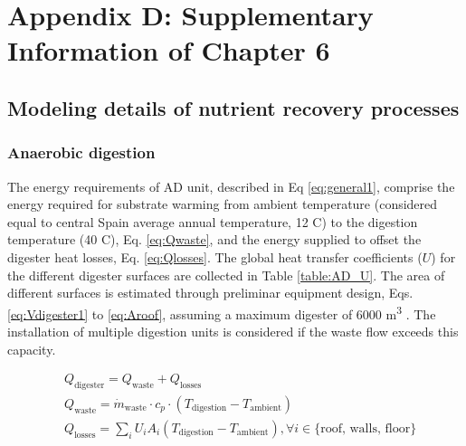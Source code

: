 \chapter{Appendix D: Supplementary Information of Chapter 6}
\begin{refsection}[referencesApD]
	
\section{Modeling details of nutrient recovery processes}
\subsection{Anaerobic digestion}
The energy requirements of AD unit, described in Eq  \ref{eq:general1}, comprise the energy required for substrate warming from ambient temperature (considered equal to central Spain average annual temperature, 12 \textdegree C) to the digestion temperature (40 \textdegree C), Eq. \ref{eq:Qwaste}, and the energy supplied to offset the digester heat losses, Eq. \ref{eq:Qlosses}. The global heat transfer coefficients ($U$) for the different digester surfaces are collected in Table \ref{table:AD_U}. 
The area of different surfaces is estimated through preliminar equipment design, Eqs. \ref{eq:Vdigester1} to \ref{eq:Aroof}, assuming a maximum digester of 6000 m\textsuperscript{3} \citep{6000AD}. The installation of multiple digestion units is considered if the waste flow exceeds this capacity.

\begin{align}
	& Q_{\text{digester}} = Q_{\text{waste}} + Q_{\text{losses}} \label{eq:general1}\\
	& Q_{\text{waste}} = \dot{m}_{\text{waste}} \cdot c_{p} \cdot \left(T_{\text{digestion}} - T_{\text{ambient}}\right) \label{eq:Qwaste} \\
	& Q_{\text{losses}} = \sum_{i} U_{i} A_{i} \left(T_{\text{digestion}} - T_{\text{ambient}}\right)\label{eq:Qlosses}, \forall i  \in \{\text{roof, walls, floor}\}
\end{align}


\end{refsection}
